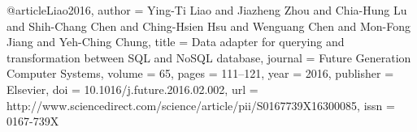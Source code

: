 @article{Liao2016,
  author    = {Ying-Ti Liao and Jiazheng Zhou and Chia-Hung Lu and Shih-Chang Chen and Ching-Hsien Hsu and Wenguang Chen and Mon-Fong Jiang and Yeh-Ching Chung},
  title     = {Data adapter for querying and transformation between SQL and NoSQL database},
  journal   = {Future Generation Computer Systems},
  volume    = {65},
  pages     = {111--121},
  year      = {2016},
  publisher = {Elsevier},
  doi       = {10.1016/j.future.2016.02.002},
  url       = {http://www.sciencedirect.com/science/article/pii/S0167739X16300085},
  issn      = {0167-739X}
}
